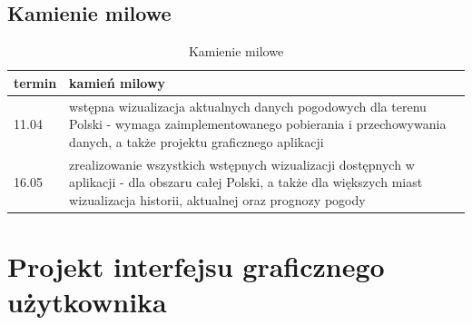 \documentclass[10pt, a4paper]{article}
\begin{document}
\subsection{Kamienie milowe}
   \begin{table}[!h]
	\label{table_exres}
	\begin{tabular}{p{15mm}|p{120mm}}
		
		termin & kamień milowy\\ \hline
		11.04 & wstępna wizualizacja aktualnych danych pogodowych dla terenu Polski - wymaga zaimplementowanego pobierania i przechowywania danych, a także projektu graficznego aplikacji\\

		16.05 & zrealizowanie wszystkich wstępnych wizualizacji dostępnych w aplikacji - dla obszaru całej Polski, a także dla większych miast wizualizacja historii, aktualnej oraz prognozy pogody\\
	\end{tabular}
	\caption{Kamienie milowe}
\end{table}

\section{Projekt interfejsu graficznego użytkownika}
\end{document}
